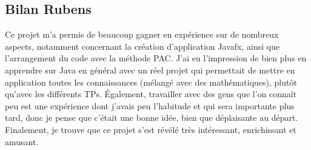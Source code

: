 \subsection{Bilan Rubens}

Ce projet m'a permis de beaucoup gagner en expérience sur de nombreux aspects, notamment concernant la création d'application Javafx, ainsi que l'arrangement du code avec la méthode PAC. J'ai eu l'impression de bien plus en apprendre sur Java en général avec un réel projet qui permettait de mettre en application toutes les connaissances (mélangé avec des mathématiques), plutôt qu'avec les différents TPs. Également, travailler avec des gens que l'on connaît peu est une expérience dont j'avais peu l'habitude et qui sera importante plus tard, donc je pense que c'était une bonne idée, bien que déplaisante au départ. 
Finalement, je trouve que ce projet s'est révélé très intéressant, enrichissant et amusant.